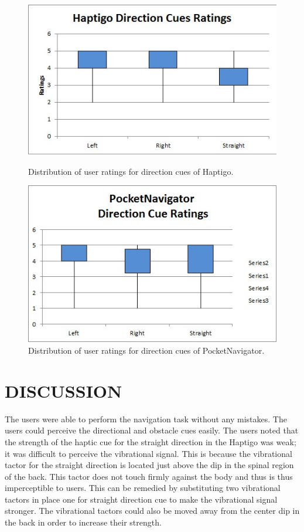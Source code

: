 \documentclass{sigchi}
\begin{document}
\begin{figure}[ht]
\centering
\includegraphics[width=0.8\columnwidth]{Images/HaptigoDirectionCueRatings.jpg}
\label{figure:haptigo:userratings}
\caption{Distribution of user ratings for direction cues of Haptigo.}
\end{figure}
    
\begin{figure}[ht]
\centering
\includegraphics[width=0.8\columnwidth]{Images/PocketNavigatorDirectionCueRatings.jpg}
\caption{Distribution of user ratings for direction cues of PocketNavigator.}
\label{figure:pocketnavigator:userratings}
\end{figure}

\section{DISCUSSION}
The users were able to perform the navigation task without any mistakes. The users could perceive the directional and obstacle cues easily. The users noted that the strength of the haptic cue for the straight direction in the Haptigo was weak; it was difficult to perceive the vibrational signal. This is because the vibrational tactor for the straight direction is located just above the dip in the spinal region of the back. This tactor does not touch firmly against the body and thus is thus imperceptible to users. This can be remedied by substituting two vibrational tactors in place one for straight direction cue to make the vibrational signal stronger. The vibrational tactors could also be moved away from the center dip in the back in order to increase their strength.
\end{document}
